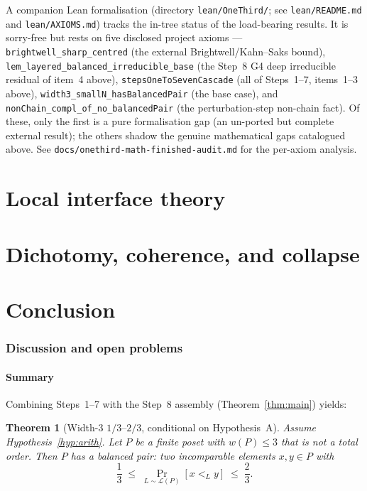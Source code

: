 \documentclass[11pt]{article}
\newtheorem{theorem}{Theorem}[section]
\theoremstyle{definition}
\theoremstyle{remark}
\begin{document}
A companion Lean formalisation (directory \texttt{lean/OneThird/};
see \texttt{lean/README.md} and \texttt{lean/AXIOMS.md}) tracks the
in-tree status of the load-bearing results. It is sorry-free but
rests on five disclosed project axioms --- \texttt{brightwell\_sharp\_centred}
(the external Brightwell/Kahn--Saks bound),
\texttt{lem\_layered\_balanced\_irreducible\_base} (the Step~8 G4 deep
irreducible residual of item~4 above), \texttt{stepsOneToSevenCascade}
(all of Steps~1--7, items~1--3 above), \texttt{width3\_smallN\_hasBalancedPair}
(the base case), and \texttt{nonChain\_compl\_of\_no\_balancedPair}
(the perturbation-step non-chain fact). Of these, only the first is a
pure formalisation gap (an un-ported but complete external result);
the others shadow the genuine mathematical gaps catalogued above. See
\texttt{docs/onethird-math-finished-audit.md} for the per-axiom
analysis.

\part{Local interface theory}






\part{Dichotomy, coherence, and collapse}





\part{Conclusion}



\section{Discussion and open problems}
\label{sec:discussion}

\subsection{Summary}

Combining Steps~1--7 with the Step~8 assembly
(Theorem~\ref{thm:main}) yields:

\begin{theorem}[Width-$3$ $1/3$--$2/3$, conditional on Hypothesis~A]
\label{thm:conclusion-main}
Assume Hypothesis~\ref{hyp:arith}. Let $P$ be a finite poset with
$w(P)\le 3$ that is not a total order. Then $P$ has a \emph{balanced
pair}: two incomparable elements $x,y\in P$ with
\[
   \frac{1}{3} \;\le\; \Pr_{L\sim\mathcal{L}(P)}[x <_L y] \;\le\; \frac{2}{3}.
\]
\end{theorem}
\end{document}
